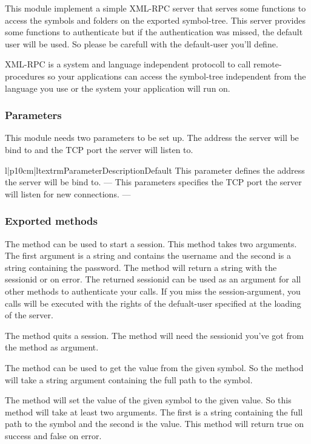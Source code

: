{
This module implement a simple XML-RPC server that serves some functions to 
access the symbols and folders on the exported symbol-tree. This server 
provides some functions to authenticate but if the authentication was missed,
the default user will be used. So please be carefull with the default-user 
you'll define. 

XML-RPC is a system and language independent protocoll to call 
remote-procedures so your applications can access the symbol-tree independent
from the language you use or the system your application will run on.

\subsubsection{Parameters}
This module needs two parameters to be set up. The address the server will be
bind to and the TCP port the server will listen to.
\begin{tableiii}{l|p{10cm}|l}{textrm}{Parameter}{Description}{Default}
        {This parameter defines the address the server will be bind to.}
        {---}
        {This parameters specifies the TCP port the server will listen for 
         new connections.}
        {---}
\end{tableiii}

\subsubsection{Exported methods}
The  method can be used to start a session. This method takes 
two arguments. The first argument is a string and contains the username and
the second is a string containing the password. The method will return a 
string with the sessionid or  on error. The returned sessionid
can be used as an argument for all other methods to authenticate your calls.
If you miss the session-argument, you calls will be executed with the rights
of the defualt-user specified at the loading of the server.

The  method quits a session. The method will need the sessionid
you've got from the  method as argument.

The  method can be used to get the value from the given symbol. 
So the method will take a string argument containing the full path to the 
symbol. 

The  method will set the value of the given symbol to the given
value. So this method will take at least two arguments. The first is a string
containing the full path to the symbol and the second is the value. This method
will return true on success and false on error.

}
